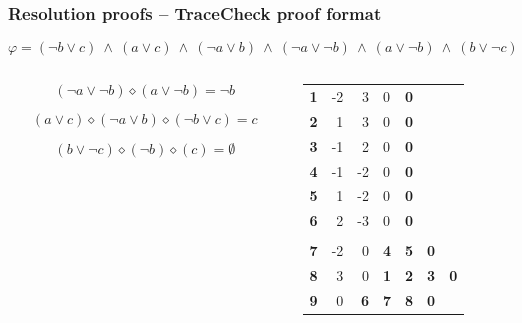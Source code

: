\documentclass[xcolor=dvipsnames]{beamer}
\begin{document}
\begin{frame}[t]
  \frametitle{Resolution proofs -- TraceCheck proof format}
	\[
        \varphi = (\neg b \vee c) ~\wedge~ (a \vee c) ~\wedge~
                  (\neg a \vee b) ~\wedge~ (\neg a \vee \neg b) ~\wedge~
                  (a \vee \neg b) ~\wedge~ (b \vee \neg c)
    \]

    \pause
    \begin{columns}
	\begin{column}{0.5\textwidth}
        \[
          (\neg a \vee \neg b) \diamond (a \vee \neg b) = \neg b
        \]

        \[
          (a \vee c) \diamond (\neg a \vee  b) \diamond (\neg b \vee c) = c
        \]

        \[
          (b \vee \neg c) \diamond (\neg b) \diamond (c) = \emptyset
        \]
	\end{column}
	\pause
    \begin{column}{0.5\textwidth}
		\begin{table}
		\begin{tabular}{rrrllll}
		\textbf{1} & -2 & 3          & 0          & \textbf{0} &            &            \\
		\textbf{2} & 1  & 3          & 0          & \textbf{0} &            &            \\
		\textbf{3} & -1 & 2          & 0          & \textbf{0} &            &            \\
		\textbf{4} & -1 & -2         & 0          & \textbf{0} &            &            \\
		\textbf{5} & 1  & -2         & 0          & \textbf{0} &            &            \\
		\textbf{6} & 2  & -3         & 0          & \textbf{0} &            &            \\
		           &    &            &            &            &            &            \\
        \textbf{7} & -2 & 0          & \textbf{4} & \textbf{5} & \textbf{0} &            \\
        \textbf{8} & 3  & 0          & \textbf{1} & \textbf{2} & \textbf{3} & \textbf{0} \\
        \textbf{9} & 0  & \textbf{6} & \textbf{7} & \textbf{8} & \textbf{0} &
		\end{tabular}
		\end{table}
	\end{column}
	\end{columns}
\end{frame}
\end{document}
